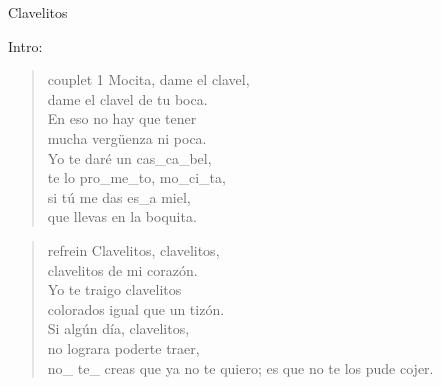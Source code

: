 \begin{song}{Clavelitos}
\begin{instrumental}{Intro:}
\end{instrumental}

\begin{verse}{couplet 1}
Mocita, dame el clavel,\\
dame el clavel de tu boca.\\
En eso no hay que tener\\
mucha vergüenza ni poca. \hspace{1em} \hspace{1em} \hspace{1em}\\
Yo te daré un cas\_ca\_bel,\\
\hspace{1em} te lo pro\_me\_to, mo\_ci\_ta, \hspace{1em} \hspace{1em} \hspace{1em}\\
si t\'u me das es\_a miel,\\
que llevas en la boquita.
\end{verse}


\begin{verse}{refrein}
Clavelitos, clavelitos,\\
clavelitos de mi corazón.\\
Yo te traigo clavelitos\\
colorados igual que un tizón.\\
Si algún día, clavelitos,\\
no lograra poderte traer,\\
no\_ te\_ creas que ya no te quiero;
es que no te los pude cojer. \hspace{1em} \hspace{1em}
\end{verse}


\end{song}
